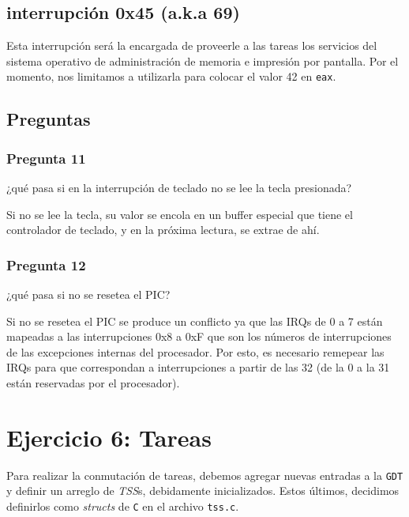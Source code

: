 \documentclass[10pt, a4paper]{article}
\begin{document}
\subsection{interrupción 0x45 (a.k.a 69)}
Esta interrupción será la encargada de proveerle a las tareas los servicios del sistema operativo de administración de memoria e impresión por pantalla. Por el momento, nos limitamos a utilizarla para colocar el valor 42 en \texttt{eax}.

\subsection{Preguntas}
\subsubsection*{Pregunta 11}
 \begin{framed}
¿qué pasa si en la interrupción de teclado no se lee la tecla presionada?
\end{framed}
Si no se lee la tecla, su valor se encola en un buffer especial que tiene el controlador de teclado, y en la próxima lectura, se extrae de ahí.

\subsubsection*{Pregunta 12}
 \begin{framed}
¿qué pasa si no se resetea el PIC?
\end{framed}
Si no se resetea el PIC se produce un conflicto ya que las IRQs de 0 a 7 están mapeadas a las interrupciones 0x8 a 0xF que son los números de interrupciones
de las excepciones internas del procesador. Por esto, es necesario remepear las IRQs para que correspondan a interrupciones a partir de las 32 (de la 0 a la 31
están reservadas por el procesador).

\newpage

\section{Ejercicio 6: Tareas}
Para realizar la conmutación de tareas, debemos agregar nuevas entradas a la \texttt{GDT} y definir un arreglo de \emph{TSS}s, debidamente inicializados. 
Estos últimos, decidimos definirlos como \emph{structs} de \texttt{C} en el archivo \texttt{tss.c}.
\end{document}
